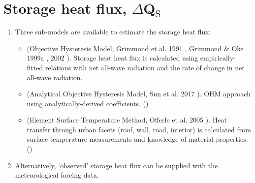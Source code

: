 \documentclass[letterpaper,10pt,english]{sphinxmanual}
\begin{document}
\section{Storage heat flux, \(\Delta\)Q$_{\text{S}}$}
\label{\detokenize{parameterisations-and-sub-models:storage-heat-flux-qs}}\begin{enumerate}
\item {} 
Three sub-models are available to estimate the storage heat flux:
\begin{itemize}
\item {} 
 (Objective Hysteresis Model, Grimmond et al. 1991 \label{\detokenize{parameterisations-and-sub-models:id8}}{\hyperref[\detokenize{references:g91ohm}]{\sphinxcrossref{{[}G91OHM{]}}}},
Grimmond \& Oke 1999a \label{\detokenize{parameterisations-and-sub-models:id9}}{\hyperref[\detokenize{references:go99qs}]{\sphinxcrossref{{[}GO99QS{]}}}}, 2002 \label{\detokenize{parameterisations-and-sub-models:id10}}{\hyperref[\detokenize{references:go2002}]{\sphinxcrossref{{[}GO2002{]}}}}). Storage heat heat flux is
calculated using empirically-fitted relations with net all-wave
radiation and the rate of change in net all-wave radiation.

\item {} 
 (Analytical Objective Hysteresis Model, Sun et al.
2017 \label{\detokenize{parameterisations-and-sub-models:id11}}{\hyperref[\detokenize{references:anohm17}]{\sphinxcrossref{{[}AnOHM17{]}}}}). OHM approach using analytically-derived coefficients.
()

\item {} 
 (Element Surface Temperature Method, Offerle et al.
2005 \label{\detokenize{parameterisations-and-sub-models:id12}}{\hyperref[\detokenize{references:oaf2005}]{\sphinxcrossref{{[}Oaf2005{]}}}}). Heat transfer through urban facets (roof, wall, road,
interior) is calculated from surface temperature measurements and
knowledge of material properties. ()

\end{itemize}

\item {} 
Alternatively, ‘observed’ storage heat flux can be supplied with the
meteorological forcing data.

\end{enumerate}
\end{document}
